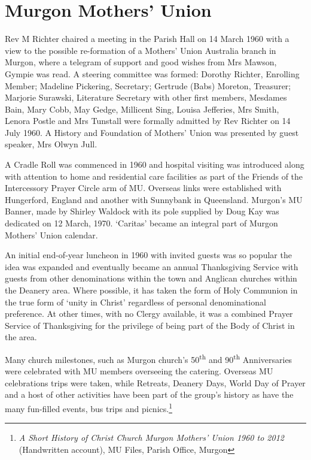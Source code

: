 \section{Murgon Mothers' Union}



Rev M Richter chaired a meeting in the Parish Hall on 14 March 1960 with a view to the possible re-formation of a Mothers' Union Australia branch in Murgon, where a telegram of support and good wishes from Mrs Mawson, Gympie was read. A steering committee was formed: Dorothy Richter, Enrolling Member; Madeline Pickering, Secretary; Gertrude (Babs) Moreton, Treasurer; Marjorie Surawski, Literature Secretary with other first members, Mesdames Bain, Mary Cobb, May Gedge, Millicent Sing, Louisa Jefferies, Mrs Smith, Lenora Postle and Mrs Tunstall were formally admitted by Rev Richter on 14 July 1960. A History and Foundation of Mothers' Union was presented by guest speaker, Mrs Olwyn Jull.



A Cradle Roll was commenced in 1960 and hospital visiting was introduced along with attention to home and residential care facilities as part of the Friends of the Intercessory Prayer Circle arm of MU. Overseas links were established with Hungerford, England and another with Sunnybank in Queensland. Murgon's MU Banner, made by Shirley Waldock with its pole supplied by Doug Kay was dedicated on 12 March, 1970. `Caritas' became an integral part of Murgon Mothers' Union calendar.



An initial end-of-year luncheon in 1960 with invited guests was so popular the idea was expanded and eventually became an annual Thanksgiving Service with guests from other denominations within the town and Anglican churches within the Deanery area. Where possible, it has taken the form of Holy Communion in the true form of `unity in Christ' regardless of personal denominational preference. At other times, with no Clergy available, it was a combined Prayer Service of Thanksgiving for the privilege of being part of the Body of Christ in the area.



Many church milestones, such as Murgon church's 50\textsuperscript{th} and 90\textsuperscript{th} Anniversaries were celebrated with MU members overseeing the catering. Overseas MU celebrations trips were taken, while Retreats, Deanery Days, World Day of Prayer and a host of other activities have been part of the group's history as have the many fun-filled events, bus trips and picnics.\footnote{\emph{A Short History of Christ Church Murgon Mothers' Union 1960 to 2012} (Handwritten account), MU Files, Parish Office, Murgon}



